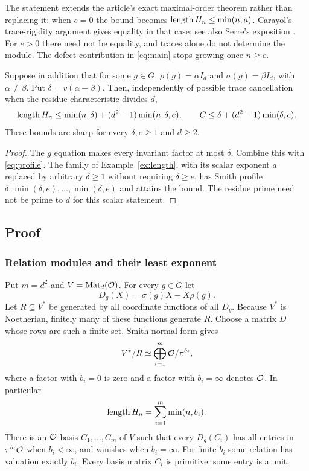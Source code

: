 The statement extends the article's exact maximal-order theorem rather
than replacing it: when $e=0$ the bound becomes $\operatorname{length} H_n\le\min(n,a)$.
Carayol's trace-rigidity argument gives equality in that case; see also
Serre's exposition \cite[Theorem 1]{Serre1993}. For $e>0$
there need not be equality, and traces alone do not determine the module.
The defect contribution in \eqref{eq:main} stops growing once $n\ge e$.

\begin{corollary}\label{cor:scalar-discrepancy}
Suppose in addition that for some $g\in G$,
$\rho(g)=\alpha I_d$ and $\sigma(g)=\beta I_d$, with $\alpha\ne\beta$.
Put $\delta=v(\alpha-\beta)$. Then, independently of possible trace
cancellation when the residue characteristic divides $d$,
\[
 \operatorname{length} H_n\le\min(n,\delta)+(d^2-1)\min(n,\delta,e),\qquad
 C\le\delta+(d^2-1)\min(\delta,e).
\]
These bounds are sharp for every $\delta,e\ge1$ and $d\ge2$.
\end{corollary}
\begin{proof}
The $g$ equation makes every invariant factor at most $\delta$. Combine
this with \eqref{eq:profile}. The family of Example~\ref{ex:length},
with its scalar exponent $a$ replaced by arbitrary $\delta\ge1$ without
requiring $\delta\ge e$, has Smith profile
$\delta,\min(\delta,e),\ldots,\min(\delta,e)$ and attains the bound.
The residue prime need not be prime to $d$ for this scalar statement.
\end{proof}

\subsection{Proof}

\subsubsection{Relation modules and their least exponent}

Put $m=d^2$ and $V=\operatorname{Mat}_d(\mathcal O)$. For every $g\in G$ let
\[
 D_g(X)=\sigma(g)X-X\rho(g).
\]
Let $R\subseteq V^*$ be generated by all coordinate functions of all $D_g$.
Because $V^*$ is Noetherian, finitely many of these functions generate $R$.
Choose a matrix $D$ whose rows are such a finite set. Smith normal form gives
\[
 V^*/R\simeq\bigoplus_{i=1}^{m}\mathcal O/\pi^{b_i},
\]
where a factor with $b_i=0$ is zero and a factor with $b_i=\infty$ denotes
$\mathcal O$. In particular
\begin{equation}\label{eq:length}
 \operatorname{length} H_n=\sum_{i=1}^m\min(n,b_i).
\end{equation}
There is an $\mathcal O$-basis $C_1,\ldots,C_m$ of $V$ such that every $D_g(C_i)$
has all entries in $\pi^{b_i}\mathcal O$ when $b_i<\infty$, and vanishes when
$b_i=\infty$. For finite $b_i$ some relation has valuation exactly $b_i$.
Every basis matrix $C_i$ is primitive: some entry is a unit.

